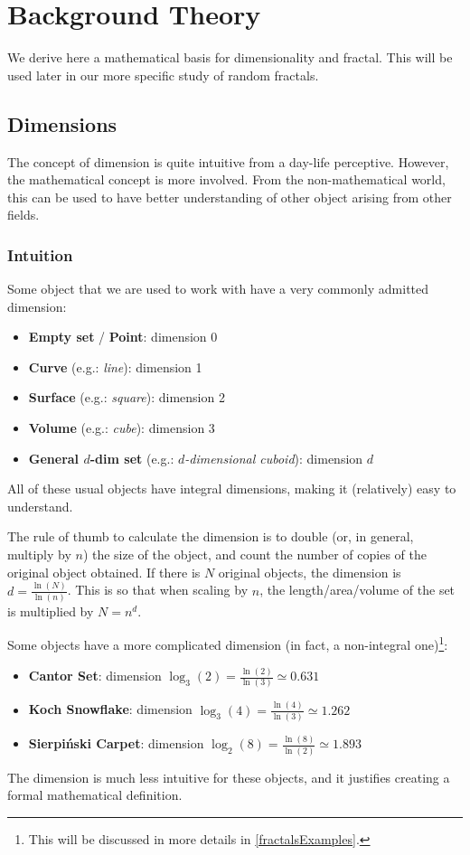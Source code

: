 \section{Background Theory}
We derive here a mathematical basis for dimensionality and fractal.
This will be used later in our more specific study of random fractals.

\subsection{Dimensions}
The concept of dimension is quite intuitive from a day-life perceptive.
However, the mathematical concept is more involved.
From the non-mathematical world, this can be used to have better understanding of other object arising from other fields.

\subsubsection{Intuition}
Some object that we are used to work with have a very commonly admitted dimension:
\begin{itemize}
	\item \textbf{Empty set} / \textbf{Point}: dimension 0
	\item \textbf{Curve} (e.g.: \textit{line}): dimension 1
	\item \textbf{Surface} (e.g.: \textit{square}): dimension 2
	\item \textbf{Volume} (e.g.: \textit{cube}): dimension 3
	\item \textbf{General $d$-dim set} (e.g.: \textit{$d$-dimensional cuboid}): dimension $d$
\end{itemize}
All of these usual objects have integral dimensions, making it (relatively) easy to understand.

The rule of thumb to calculate the dimension is to double (or, in general, multiply by $n$) the size of the object, and count the number of copies of the original object obtained.
If there is $N$ original objects, the dimension is $d = \frac{\ln(N)}{\ln(n)}$.
This is so that when scaling by $n$, the length/area/volume of the set is multiplied by $N = n^d$.

Some objects have a more complicated dimension (in fact, a non-integral one)\footnote{This will be discussed in more details in \ref{fractalsExamples}.}:
\begin{itemize}
	\item \textbf{Cantor Set}: dimension $\log_3(2) = \frac{\ln(2)}{\ln(3)} \simeq 0.631$
	\item \textbf{Koch Snowflake}: dimension $\log_3(4) = \frac{\ln(4)}{\ln(3)} \simeq 1.262$
	\item \textbf{Sierpiński Carpet}: dimension $\log_2(8) = \frac{\ln(8)}{\ln(2)} \simeq 1.893$
\end{itemize}
The dimension is much less intuitive for these objects, and it justifies creating a formal mathematical definition.

